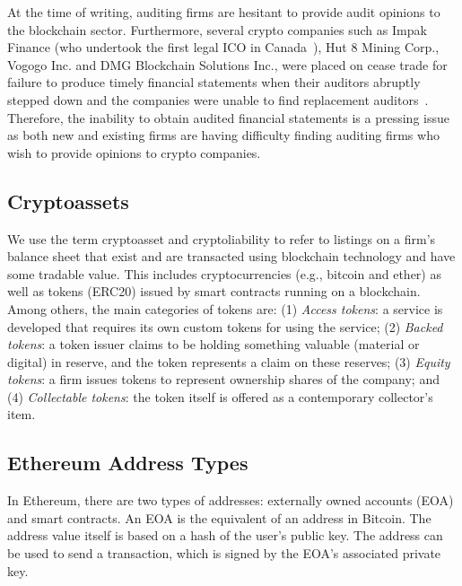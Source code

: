 At the time of writing, auditing firms are hesitant to provide audit opinions to the blockchain sector. Furthermore, several crypto companies such as Impak Finance (who undertook the first legal ICO in Canada~\cite{AMFImpactFinance}), Hut 8 Mining Corp., Vogogo Inc. and DMG Blockchain Solutions Inc., were placed on cease trade for failure to produce timely financial statements when their auditors abruptly stepped down and the companies were unable to find replacement auditors~\cite{posadzki2019crypto}. Therefore, the inability to obtain audited financial statements is a pressing issue as both new and existing firms are having difficulty finding auditing firms who wish to provide opinions to crypto companies.

\subsection{Cryptoassets}

We use the term cryptoasset and cryptoliability to refer to listings on a firm's balance sheet that exist and are transacted using blockchain technology and have some tradable value. This includes cryptocurrencies (e.g., bitcoin and ether) as well as tokens (\eg ERC20) issued by smart contracts running on a blockchain. Among others, the main categories of tokens are: (1) \textit{Access tokens}: a service is developed that requires its own custom tokens for using the service; (2) \textit{Backed tokens}: a token issuer claims to be holding something valuable (material or digital) in reserve, and the token represents a claim on these reserves; (3) \textit{Equity tokens}: a firm issues tokens to represent ownership shares of the company; and (4) \textit{Collectable tokens}: the token itself is offered as a contemporary collector's item. 

\subsection{Ethereum Address Types}

In Ethereum, there are two types of addresses: externally owned accounts (EOA) and smart contracts. An EOA is the equivalent of an address in Bitcoin. The address value itself is based on a hash of the user's public key. The address can be used to send a transaction, which is signed by the EOA's associated private key. 

